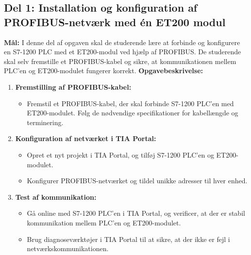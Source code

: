 \subsection*{Del 1: Installation og konfiguration af PROFIBUS-netværk med én ET200 modul}
\textbf{Mål:} I denne del af opgaven skal de studerende lære at forbinde og konfigurere en S7-1200 PLC med et ET200-modul ved hjælp af PROFIBUS. De studerende skal selv fremstille et PROFIBUS-kabel og sikre, at kommunikationen mellem PLC’en og ET200-modulet fungerer korrekt.
\newline\newline\noindent
\textbf{Opgavebeskrivelse:}
\begin{enumerate}
	\item \textbf{Fremstilling af PROFIBUS-kabel:}
	\begin{itemize}
		\item Fremstil et PROFIBUS-kabel, der skal forbinde S7-1200 PLC’en med ET200-modulet. Følg de nødvendige specifikationer for kabellængde og terminering.
	\end{itemize}
	\item \textbf{Konfiguration af netværket i TIA Portal:}
	\begin{itemize}
		\item Opret et nyt projekt i TIA Portal, og tilføj S7-1200 PLC’en og ET200-modulet.
		\item Konfigurer PROFIBUS-netværket og tildel unikke adresser til hver enhed.
	\end{itemize}
	\item \textbf{Test af kommunikation:}
	\begin{itemize}
		\item Gå online med S7-1200 PLC’en i TIA Portal, og verificer, at der er stabil kommunikation mellem PLC’en og ET200-modulet.
		\item Brug diagnoseværktøjer i TIA Portal til at sikre, at der ikke er fejl i netværkskommunikationen.
	\end{itemize}
\end{enumerate}

